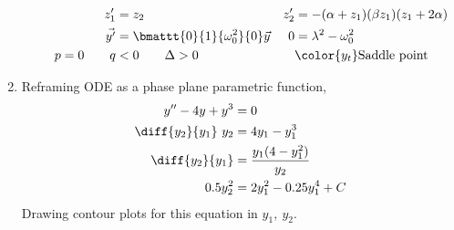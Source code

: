 \begin{enumerate}
\begin{enumerate}
\begin{align}
                        z_1'           & = z_2                                       &
                        z_2'           & = -(\alpha + z_1)(\beta z_1)(z_1 + 2\alpha)   \\
                        \vec{y'}       & = \bmattt{0}{1}{\omega_0^{2}}{0} \vec{y}    &
                        0              & = \lambda^{2} - \omega_0^{2}                  \\
                        p = 0 \qquad q & < 0 \qquad \Delta > 0                       &
                                       & \color{y_t} \text{Saddle point}
                    \end{align}
          \end{enumerate}

    \item Reframing ODE as a phase plane parametric function,
          \begin{align}
              y'' - 4y + y^{3}     & = 0                             \\
              \diff{y_2}{y_1}\ y_2 & = 4y_1 - y_1^{3}                \\
              \diff{y_2}{y_1}      & = \frac{y_1 (4 - y_1^{2})}{y_2} \\
              0.5 y_2^{2}          & = 2y_1^{2} - 0.25y_1^{4} + C
          \end{align}
          Drawing contour plots for this equation in $ y_1,\ y_2 $.
          \begin{figure}[H]
              \centering
          \end{figure}
\end{enumerate}